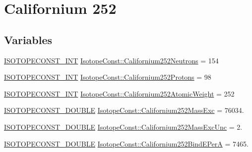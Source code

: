 \hypertarget{group___isotope_const-_californium-_cf252}{}\section{Californium 252}
\label{group___isotope_const-_californium-_cf252}
\subsection*{Variables}
\begin{DoxyCompactItemize}
\item 
\mbox{\hyperlink{group___isotope_const-_macros_ga5f18360b3e99483a35c32d789e62621c}{I\+S\+O\+T\+O\+P\+E\+C\+O\+N\+S\+T\+\_\+\+I\+NT}} \mbox{\hyperlink{group___isotope_const-_californium-_cf252_ga31148d77060e26b2a9c4369d3d0e92df}{Isotope\+Const\+::\+Californium252\+Neutrons}} = 154
\item 
\mbox{\hyperlink{group___isotope_const-_macros_ga5f18360b3e99483a35c32d789e62621c}{I\+S\+O\+T\+O\+P\+E\+C\+O\+N\+S\+T\+\_\+\+I\+NT}} \mbox{\hyperlink{group___isotope_const-_californium-_cf252_gab8a4f1773a73e69f3089c1a1d7c77fc2}{Isotope\+Const\+::\+Californium252\+Protons}} = 98
\item 
\mbox{\hyperlink{group___isotope_const-_macros_ga5f18360b3e99483a35c32d789e62621c}{I\+S\+O\+T\+O\+P\+E\+C\+O\+N\+S\+T\+\_\+\+I\+NT}} \mbox{\hyperlink{group___isotope_const-_californium-_cf252_ga51081fcf255fac099ec5047fd42c68a4}{Isotope\+Const\+::\+Californium252\+Atomic\+Weight}} = 252
\item 
\mbox{\hyperlink{group___isotope_const-_macros_ga8f45a7272ce02c0b4c65c44636ed719a}{I\+S\+O\+T\+O\+P\+E\+C\+O\+N\+S\+T\+\_\+\+D\+O\+U\+B\+LE}} \mbox{\hyperlink{group___isotope_const-_californium-_cf252_ga1abf2031646f1ad2c4d41ce056110510}{Isotope\+Const\+::\+Californium252\+Mass\+Exc}} = 76034.
\item 
\mbox{\hyperlink{group___isotope_const-_macros_ga8f45a7272ce02c0b4c65c44636ed719a}{I\+S\+O\+T\+O\+P\+E\+C\+O\+N\+S\+T\+\_\+\+D\+O\+U\+B\+LE}} \mbox{\hyperlink{group___isotope_const-_californium-_cf252_ga91ee9d6b5e45e80a04c1e4c35670fdba}{Isotope\+Const\+::\+Californium252\+Mass\+Exc\+Unc}} = 2.
\item 
\mbox{\hyperlink{group___isotope_const-_macros_ga8f45a7272ce02c0b4c65c44636ed719a}{I\+S\+O\+T\+O\+P\+E\+C\+O\+N\+S\+T\+\_\+\+D\+O\+U\+B\+LE}} \mbox{\hyperlink{group___isotope_const-_californium-_cf252_ga22b9f8ddb8edafda23c8887112bb5a52}{Isotope\+Const\+::\+Californium252\+Bind\+E\+PerA}} = 7465.

\end{DoxyCompactItemize}
